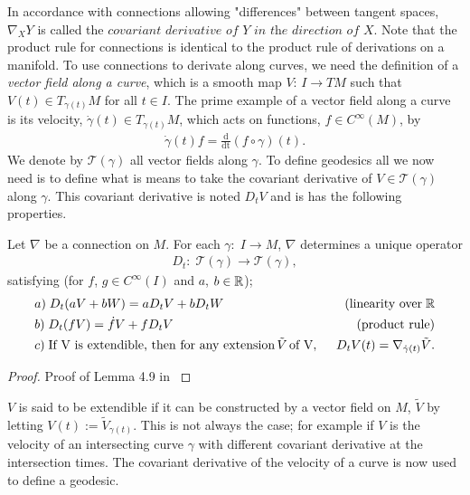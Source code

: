 In accordance with connections allowing "differences" between tangent spaces, $ \nabla_X Y $ is called the $\textit{covariant derivative of Y in the direction of X}$. Note that the product rule for connections is identical to the product rule of derivations on a manifold. To use connections to derivate along curves, we need the definition of a \textit{vector field along a curve}, which is a smooth map $V: \, I \rightarrow TM$ such that $V(t) \in T_{\gamma(t)} M$ for all $t \in I$. The prime example of a vector field along a curve is its velocity, $\dot{\gamma}(t) \in T_{\gamma(t)} M$, which acts on functions, $f \in C^\infty(M)$, by
\begin{align*}
\dot{\gamma}(t) f = \frac{\text{d}}{\text{dt}} (f \circ \gamma)(t).
\end{align*} 
We denote by $\mathcal{T}(\gamma)$ all vector fields along $\gamma$. 
To define geodesics all we now need is to define what is means to take the covariant derivative of $V \in \mathcal{T}(\gamma)$ along $\gamma$. This covariant derivative is noted $D_t V$ and is has the following properties.

\begin{lemma}
Let $\nabla$ be a connection on $M$. For each $\gamma: \; I \rightarrow M$, $\nabla$ determines a unique operator
\begin{align*}
D_t: \; \mathcal{T}(\gamma) \rightarrow \mathcal{T}(\gamma),
\end{align*} 
satisfying (for $f$, $g \in C^\infty(I)$ and $a$, $b \in \mathbb{R}$);
\begin{align*}
& a) \; D_t(aV + bW) = aD_tV + bD_tW & \text{(linearity over} \; \mathbb{R} \\
& b) \; D_t(fV) = \dot{f}V + fD_tV & \text{(product rule)} \\
& c) \; \text{If V is extendible, then for any extension} \, \tilde{V} \, \text{of V}, \; \; & D_tV(t) = \nabla_{\dot{\gamma}(t)} \tilde{V}.
\end{align*}
\end{lemma}
\begin{proof}
Proof of Lemma 4.9 in \cite{lee2006riemannian}
\end{proof}

$V$ is said to be extendible if it can be constructed by a vector field on $M$, $\tilde{V}$ by letting $V(t) := \tilde{V}_{\gamma(t)}$. This is not always the case; for example if $V$ is the velocity of an intersecting curve $\gamma$ with different covariant derivative at the intersection times. The covariant derivative of the velocity of a curve is now used to define a geodesic.

